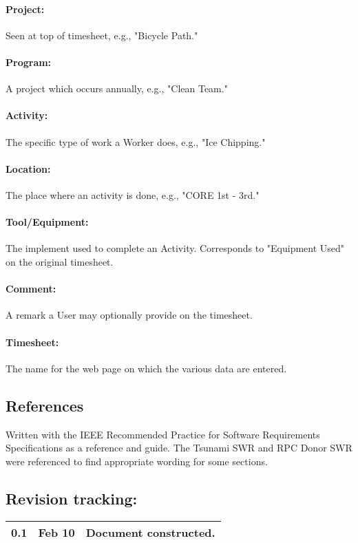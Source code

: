 \documentclass[12pt]{article}
\begin{document}
\paragraph{Project:} Seen at top of timesheet, e.g., "Bicycle Path."
\paragraph{Program:} A project which occurs annually, e.g., "Clean Team."
\paragraph{Activity:} The specific type of work a Worker does, e.g., "Ice Chipping."
\paragraph{Location:} The place where an activity is done, e.g., "CORE 1st - 3rd."
\paragraph{Tool/Equipment:} The implement used to complete an Activity. Corresponds to "Equipment Used" on the original timesheet.
\paragraph{Comment:} A remark a User may optionally provide on the timesheet.
\paragraph{Timesheet:} The name for the web page on which the various data are entered.


\subsection{References}
Written with the IEEE Recommended Practice for Software Requirements Specifications as a reference and guide. The Tsunami SWR and RPC Donor SWR were referenced to find appropriate wording for some sections.

\subsection{Revision tracking:}
\begin{tabular}{|l|r|p{5in}|}
\hline
0.1 & Feb 10 & Document constructed.\\
\hline
\end{tabular}
\end{document}
